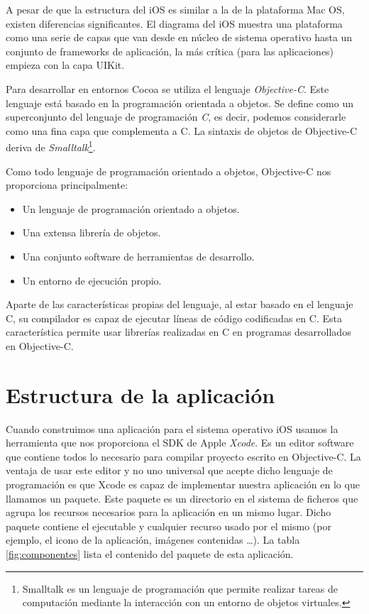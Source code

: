  A pesar de que la estructura del iOS es similar a la de la plataforma Mac OS, existen diferencias significantes. El diagrama del iOS muestra una plataforma como una serie de capas que van desde en núcleo de sistema operativo hasta un conjunto de frameworks de aplicación, la más crítica (para las aplicaciones) empieza con la capa UIKit.
 
 Para desarrollar en entornos Cocoa se utiliza el lenguaje \emph{Objective-C}. Este lenguaje está basado en la programación orientada a objetos. Se define como un superconjunto del lenguaje de programación \emph{C}, es decir, podemos considerarle como una fina capa que complementa a C. La sintaxis de objetos de Objective-C deriva de \emph{Smalltalk}\footnote{Smalltalk es un lenguaje de programación que permite realizar tareas de computación mediante la interacción con un entorno de objetos virtuales.}.
 
  Como todo lenguaje de programación orientado a objetos, Objective-C nos proporciona principalmente:
 \begin{itemize}
	\item Un lenguaje de programación orientado a objetos.
	\item Una extensa librería de objetos.
	\item Una conjunto software de herramientas de desarrollo.
	\item Un entorno de ejecución propio.
\end{itemize}

 Aparte de las características propias del lenguaje, al estar basado en el lenguaje C, su compilador es capaz de ejecutar líneas de código codificadas en C. Esta característica permite usar librerías realizadas en C en programas desarrollados en Objective-C. 
 
\section{Estructura de la aplicación}
 Cuando construimos una aplicación para el sistema operativo iOS usamos la herramienta que nos proporciona el SDK de Apple \emph{Xcode}. Es un editor software que contiene todos lo necesario para compilar proyecto escrito en Objective-C. La ventaja de usar este editor y no uno universal que acepte dicho lenguaje de programación es que Xcode es capaz de implementar nuestra aplicación en lo que llamamos un paquete. Este paquete es un directorio en el sistema de ficheros que agrupa los recursos necesarios para la aplicación en un mismo lugar. Dicho paquete contiene el ejecutable y cualquier recurso usado por el mismo (por ejemplo, el icono de la aplicación, imágenes contenidas \ldots). La tabla \ref{fig:componentes} lista el contenido del paquete de esta aplicación.
 
